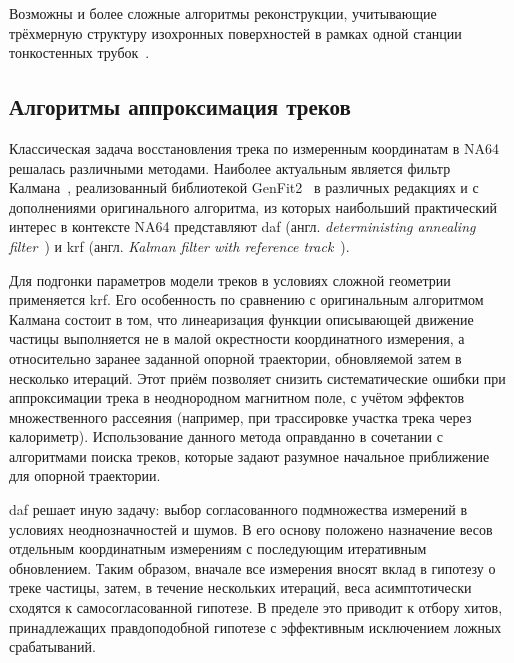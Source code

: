 
Возможны и более сложные алгоритмы реконструкции, учитывающие
трёхмерную структуру изохронных поверхностей в рамках одной станции
тонкостенных трубок~\cite{straws-peshekhonov2015}.

\subsection{Алгоритмы аппроксимация треков}

Классическая задача восстановления трека по измеренным
координатам в NA64 решалась различными методами.
Наиболее актуальным является фильтр Калмана~\cite{kalman-1960},
реализованный библиотекой GenFit2~\cite{Genfit2_Rauch_2015}
в различных редакциях и с дополнениями оригинального алгоритма, из которых
наибольший практический интерес в контексте NA64
представляют
\acrshort{daf} (англ. \emph{deterministing annealing filter}~\cite{daf-track-fitting})
и \acrshort{krf}
(англ. \emph{Kalman filter with reference track}~\cite{krf-kalman-w-reference-track}).

Для подгонки параметров модели треков в условиях сложной геометрии
применяется \acrshort{krf}.
Его особенность по сравнению с оригинальным алгоритмом Калмана
состоит в том, что линеаризация функции описывающей движение
частицы выполняется не в малой окрестности координатного измерения, а
относительно заранее заданной опорной траектории,
обновляемой затем в несколько итераций. Этот приём позволяет снизить
систематические ошибки при аппроксимации трека в
неоднородном магнитном поле, с учётом эффектов множественного
рассеяния (например, при трассировке участка трека через калориметр).
Использование данного метода оправданно в сочетании с алгоритмами
поиска треков, которые задают разумное начальное приближение
для опорной траектории. %

\acrshort{daf} решает иную задачу: выбор согласованного подмножества
измерений в условиях неоднозначностей и шумов. В
его основу положено назначение весов отдельным координатным измерениям
с последующим итеративным обновлением. Таким образом, вначале все
измерения вносят вклад в гипотезу о треке частицы, затем, в течение
нескольких итераций, веса
асимптотически сходятся к самосогласованной гипотезе.
В пределе это приводит к отбору хитов, принадлежащих
правдоподобной гипотезе с эффективным исключением ложных
срабатываний.

